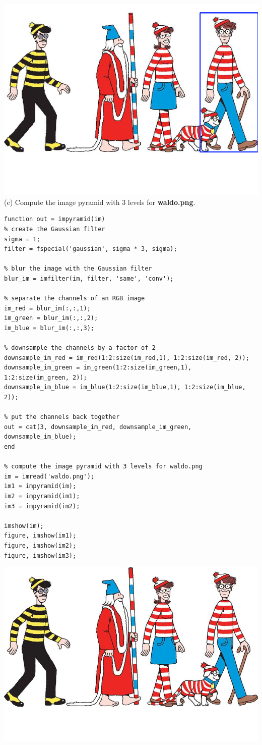 \documentclass[11pt]{article}
\begin{document}
\includegraphics[scale=0.5]{waldoRect}
\\
(c) Compute the image pyramid with 3 levels for \textbf{waldo.png}.
\begin{lstlisting}
function out = impyramid(im)
% create the Gaussian filter
sigma = 1;
filter = fspecial('gaussian', sigma * 3, sigma);

% blur the image with the Gaussian filter
blur_im = imfilter(im, filter, 'same', 'conv');

% separate the channels of an RGB image
im_red = blur_im(:,:,1);
im_green = blur_im(:,:,2);
im_blue = blur_im(:,:,3);

% downsample the channels by a factor of 2
downsample_im_red = im_red(1:2:size(im_red,1), 1:2:size(im_red, 2));
downsample_im_green = im_green(1:2:size(im_green,1), 1:2:size(im_green, 2));
downsample_im_blue = im_blue(1:2:size(im_blue,1), 1:2:size(im_blue, 2));

% put the channels back together
out = cat(3, downsample_im_red, downsample_im_green, downsample_im_blue);
end

% compute the image pyramid with 3 levels for waldo.png
im = imread('waldo.png');
im1 = impyramid(im);
im2 = impyramid(im1);
im3 = impyramid(im2);

imshow(im);
figure, imshow(im1);
figure, imshow(im2);
figure, imshow(im3);
\end{lstlisting}
\includegraphics[scale=0.5]{waldo}
\end{document}
